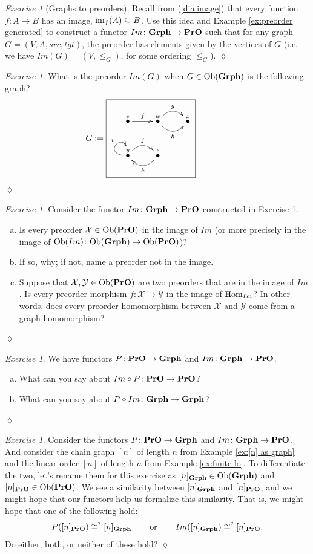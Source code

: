 \documentclass{book}
\def\tn{\textnormal}
\def\mc{\mathcal}
\def\Hom{\tn{Hom}}
\def\im{\tn{im}}
\def\Ob{\tn{Ob}}
\def\hsp{\hspace{.3in}}
\def\to{\rightarrow}
\def\taking{\colon}
\def\ss{\subseteq}
\def\iso{\cong}
\newcommand{\LMO}[1]{\stackrel{#1}{\bullet}}
\def\Grph{{\bf Grph}}
\def\PrO{{\bf PrO}}
\def\mcX{\mc{X}}
\def\mcY{\mc{Y}}
\theoremstyle{remark}
\newtheorem{exc}[subsubsection]{Exercise}
\newenvironment{exercise}{\begin{exc}}{\hspace*{\fill}$\lozenge$\end{exc}}
\theoremstyle{definition}
\def\sexc{\begin{enumerate}[a.)]\setlength{\itemsep}{.1cm}\setlength{\parskip}{.1cm}\item}
\def\next{\item}
\def\endsexc{\end{enumerate}}
\begin{document}
\begin{exercise}[Graphs to preorders]\label{exc:grph to pro}
Recall from (\ref{dia:image}) that every function $f\taking A\to B$ has an image, $\im_f(A)\ss B$. Use this idea and Example \ref{ex:preorder generated} to construct a functor $Im\taking\Grph\to\PrO$\index{a functor!$\Grph\to\PrO$} such that for any graph $G=(V,A,src,tgt)$, the preorder has elements given by the vertices of $G$ (i.e. we have $Im(G)=(V,\leq_G)$, for some ordering $\leq_G$).
\end{exercise}

\begin{exercise}
What is the preorder $Im(G)$ when $G\in\Ob(\Grph)$ is the following graph?
$$
G:=\parbox{2in}{\fbox{\xymatrix{\LMO{v}\ar[r]^f&\LMO{w}\ar@/_1pc/[r]_h\ar@/^1pc/[r]^g&\LMO{x}\\\LMO{y}\ar@(l,u)[]^i\ar@/^1pc/[r]^j&\LMO{z}\ar@/^1pc/[l]^k}}}
$$
\end{exercise}

\begin{exercise}
Consider the functor $Im\taking\Grph\to\PrO$ constructed in Exercise \ref{exc:grph to pro}.
\sexc Is every preorder $\mcX\in\Ob(\PrO)$ in the image of $Im$ (or more precisely in the image of $\Ob(Im)\taking\Ob(\Grph)\to\Ob(\PrO)$)?
\next If so, why; if not, name a preorder not in the image.
\next Suppose that $\mcX,\mcY\in\Ob(\PrO)$ are two preorders that are in the image of $Im$. Is every preorder morphism $f\taking\mcX\to\mcY$ in the image of $\Hom_{Im}$? In other words, does every preorder homomorphism between $\mcX$ and $\mcY$ come from a graph homomorphism?
\endsexc
\end{exercise}

\begin{exercise}
We have functors $P\taking\PrO\to\Grph$ and $Im\taking\Grph\to\PrO$.
\sexc What can you say about $Im\circ P\taking\PrO\to\PrO$?
\next What can you say about $P\circ Im\taking\Grph\to\Grph$?
\endsexc
\end{exercise}

\begin{exercise}
Consider the functors $P\taking\PrO\to\Grph$ and $Im\taking\Grph\to\PrO$. And consider the chain graph $[n]$ of length $n$ from Example \ref{ex:[n] as graph} and the linear order $[n]$ of length $n$ from Example \ref{ex:finite lo}. To differentiate the two, let's rename them for this exercise as $[n]_{\Grph}\in\Ob(\Grph)$ and $[n]_{\PrO}\in\Ob(\PrO)$. We see a similarity between $[n]_{\Grph}$ and $[n]_{\PrO}$, and we might hope that our functors help us formalize this similarity. That is, we might hope that one of the following hold: 
$$P([n]_{\PrO})\iso^? [n]_{\Grph}\hsp\tn{or}\hsp Im([n]_{\Grph})\iso^? [n]_{\PrO}.$$ 
Do either, both, or neither of these hold?
\end{exercise}
\end{document}
